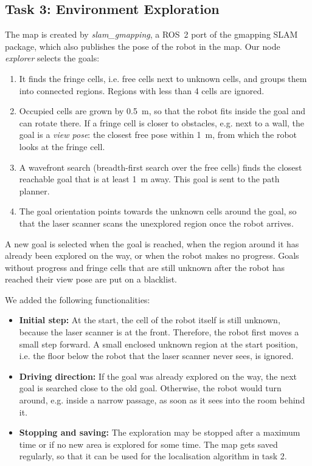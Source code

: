\documentclass[../report.tex]{subfiles}
\begin{document}
    \subsection{Task 3: Environment Exploration}
    \label{sec:describing_code:task3}

    The map is created by \emph{slam\_gmapping}, a ROS~2 port of the gmapping SLAM package, which also publishes the pose of the robot in the map.
    Our node \emph{explorer} selects the goals:
    \begin{enumerate}
        \item It finds the fringe cells, i.e. free cells next to unknown cells, and groups them into connected regions. Regions with less than 4 cells are ignored.
        \item Occupied cells are grown by \SI{0.5}{m}, so that the robot fits inside the goal and can rotate there. If a fringe cell is closer to obstacles, e.g. next to a wall, the goal is a \emph{view pose}: the closest free pose within \SI{1}{m}, from which the robot looks at the fringe cell.
        \item A wavefront search (breadth-first search over the free cells) finds the closest reachable goal that is at least \SI{1}{m} away. This goal is sent to the path planner.
        \item The goal orientation points towards the unknown cells around the goal, so that the laser scanner scans the unexplored region once the robot arrives.
    \end{enumerate}
    A new goal is selected when the goal is reached, when the region around it has already been explored on the way, or when the robot makes no progress. Goals without progress and fringe cells that are still unknown after the robot has reached their view pose are put on a blacklist.

    We added the following functionalities:
    \begin{itemize}
        \item \textbf{Initial step:} At the start, the cell of the robot itself is still unknown, because the laser scanner is at the front. Therefore, the robot first moves a small step forward. A small enclosed unknown region at the start position, i.e. the floor below the robot that the laser scanner never sees, is ignored.
        \item \textbf{Driving direction:} If the goal was already explored on the way, the next goal is searched close to the old goal. Otherwise, the robot would turn around, e.g. inside a narrow passage, as soon as it sees into the room behind it.
        \item \textbf{Stopping and saving:} The exploration may be stopped after a maximum time or if no new area is explored for some time. The map gets saved regularly, so that it can be used for the localisation algorithm in task 2.
    \end{itemize}
\end{document}
